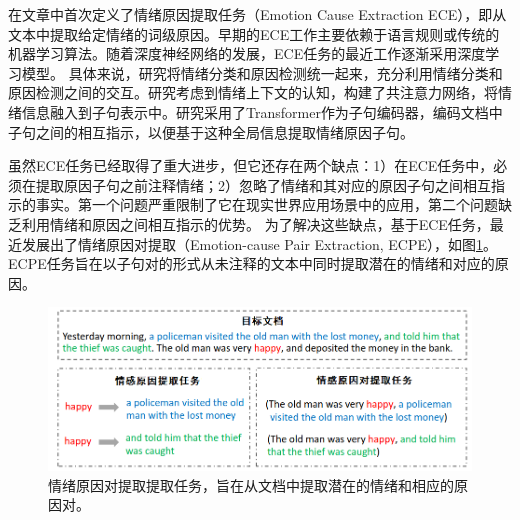 
在文章\cite{lee-etal-2010-text}中首次定义了情绪原因提取任务（Emotion Cause Extraction ECE），即从文本中提取给定情绪的词级原因。早期的ECE工作主要依赖于语言规则或传统的机器学习算法\cite{DBLP:conf/emnlp/GuiWXLZ16}。随着深度神经网络的发展，ECE任务的最近工作逐渐采用深度学习模型。
具体来说，研究\cite{DBLP:conf/emnlp/ChenHCL18}将情绪分类和原因检测统一起来，充分利用情绪分类和原因检测之间的交互。研究\cite{DBLP:conf/emnlp/LiSFWZ18}考虑到情绪上下文的认知，构建了共注意力网络，将情绪信息融入到子句表示中。研究\cite{DBLP:conf/ijcai/XiaZD19}采用了Transformer\cite{DBLP:conf/nips/VaswaniSPUJGKP17}作为子句编码器，编码文档中子句之间的相互指示，以便基于这种全局信息提取情绪原因子句。

虽然ECE任务已经取得了重大进步，但它还存在两个缺点：1）在ECE任务中，必须在提取原因子句之前注释情绪；2）忽略了情绪和其对应的原因子句之间相互指示的事实。第一个问题严重限制了它在现实世界应用场景中的应用，第二个问题缺乏利用情绪和原因之间相互指示的优势。
为了解决这些缺点，基于ECE任务，最近发展出了情绪原因对提取（Emotion-cause Pair Extraction, ECPE）\cite{DBLP:conf/acl/XiaD19}，如图\ref{fig:ecpe}。ECPE任务旨在以子句对的形式从未注释的文本中同时提取潜在的情绪和对应的原因。



\begin{figure}[ht]
	\centering
    \includegraphics[width=0.95\linewidth]{figures/newtask.png}
	\caption{情绪原因对提取提取任务，旨在从文档中提取潜在的情绪和相应的原因对。}
    \label{fig:ecpe}
\end{figure}


